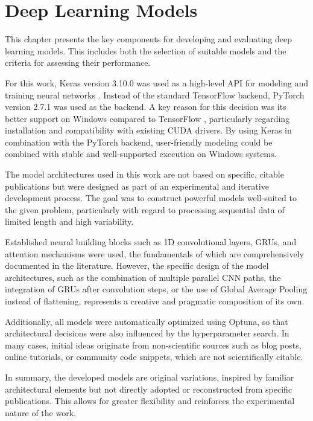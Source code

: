 \section{Deep Learning Models}
\label{chap:dl-models}

This chapter presents the key components for developing and evaluating deep learning models.
This includes both the selection of suitable models and the criteria for assessing their performance.

For this work, Keras version 3.10.0 was used as a high-level API for modeling and training neural networks \cite{keras-home}.
Instead of the standard TensorFlow backend, PyTorch version 2.7.1 was used as the backend.
A key reason for this decision was its better support on Windows compared to TensorFlow \cite{tf-windows}, particularly regarding installation and compatibility with existing CUDA drivers.
By using Keras in combination with the PyTorch backend, user-friendly modeling could be combined with stable and well-supported execution on Windows systems.

The model architectures used in this work are not based on specific, citable publications but were designed as part of an experimental and iterative development process.
The goal was to construct powerful models well-suited to the given problem, particularly with regard to processing sequential data of limited length and high variability.

Established neural building blocks such as 1D convolutional layers, GRUs, and attention mechanisms were used, the fundamentals of which are comprehensively documented in the literature.
However, the specific design of the model architectures, such as the combination of multiple parallel CNN paths, the integration of GRUs after convolution steps, or the use of Global Average Pooling instead of flattening, represents a creative and pragmatic composition of its own.

Additionally, all models were automatically optimized using Optuna, so that architectural decisions were also influenced by the hyperparameter search.
In many cases, initial ideas originate from non-scientific sources such as blog posts, online tutorials, or community code snippets, which are not scientifically citable.

In summary, the developed models are original variations, inspired by familiar architectural elements but not directly adopted or reconstructed from specific publications.
This allows for greater flexibility and reinforces the experimental nature of the work.

